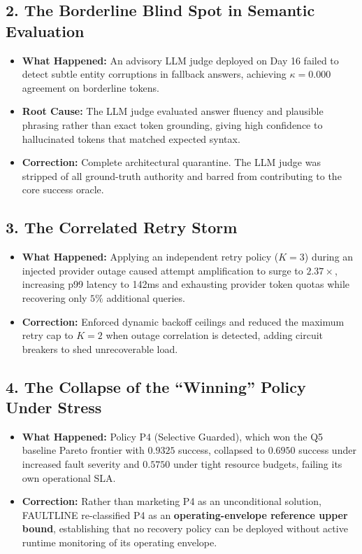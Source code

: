 \subsection{2. The Borderline Blind Spot in Semantic Evaluation}
\begin{itemize}
    \item \textbf{What Happened:} An advisory LLM judge deployed on Day 16 failed to detect subtle entity corruptions in fallback answers, achieving $\kappa = 0.000$ agreement on borderline tokens.
    \item \textbf{Root Cause:} The LLM judge evaluated answer fluency and plausible phrasing rather than exact token grounding, giving high confidence to hallucinated tokens that matched expected syntax.
    \item \textbf{Correction:} Complete architectural quarantine. The LLM judge was stripped of all ground-truth authority and barred from contributing to the core success oracle.
\end{itemize}

\subsection{3. The Correlated Retry Storm}
\begin{itemize}
    \item \textbf{What Happened:} Applying an independent retry policy ($K=3$) during an injected provider outage caused attempt amplification to surge to $2.37\times$, increasing p99 latency to 142ms and exhausting provider token quotas while recovering only $5\%$ additional queries.
    \item \textbf{Correction:} Enforced dynamic backoff ceilings and reduced the maximum retry cap to $K=2$ when outage correlation is detected, adding circuit breakers to shed unrecoverable load.
\end{itemize}

\subsection{4. The Collapse of the ``Winning'' Policy Under Stress}
\begin{itemize}
    \item \textbf{What Happened:} Policy P4 (Selective Guarded), which won the Q5 baseline Pareto frontier with $0.9325$ success, collapsed to $0.6950$ success under increased fault severity and $0.5750$ under tight resource budgets, failing its own operational SLA.
    \item \textbf{Correction:} Rather than marketing P4 as an unconditional solution, FAULTLINE re-classified P4 as an \textbf{operating-envelope reference upper bound}, establishing that no recovery policy can be deployed without active runtime monitoring of its operating envelope.
\end{itemize}

